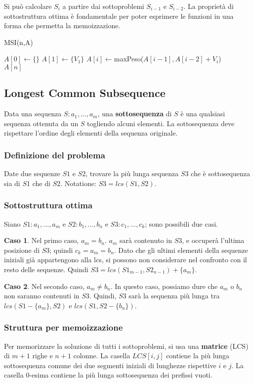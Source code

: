 \documentclass[11pt]{article}
\begin{document}
Si può calcolare $S_i$ a partire dai sottoproblemi $S_{i-1}$ e $S_{i-2}$.
La proprietà di sottostruttura ottima è fondamentale per poter esprimere le funzioni in una forma che permetta la memoizzazione.
\begin{algorithm}
    \caption{MSI(n,A)}
    \begin{algorithmic}
        \State $A[0]\gets \{\}$
        \State $A[1]\gets \{V_1\}$
            \State $A[i]\gets$maxPeso($A[i-1], A[i-2]+V_i$)
        \EndFor\\
        \Return $A[n]$
    \end{algorithmic}
\end{algorithm}
\subsection{Longest Common Subsequence}
Data una sequenza $S:a_1,\dots,a_m$, una \textbf{sottosequenza} di $S$ è una qualsiasi sequenza ottenuta da un $S$ togliendo 
alcuni elementi. La sottosequenza deve rispettare l'ordine degli elementi della sequenza originale.
\subsubsection{Definizione del problema}
Date due sequenze $S1$ e $S2$, trovare la più lunga sequenza $S3$ che è sottosequenza sia di $S1$ che di $S2$. Notatione:
$S3=lcs(S1,S2)$.
\subsubsection{Sottostruttura ottima}
Siano $S1:a_1,\dots,a_m$ e $S2:b_1,\dots,b_n$ e $S3:c_1,\dots,c_k$; sono possibili due casi.

\textbf{Caso 1}. Nel primo caso, $a_m=b_n$. $a_m$ sarà contenuto in $S3$, e occuperà l'ultima posizione di $S3$; quindi 
$c_k=a_m=b_n$. Dato che gli ultimi elementi della sequenze iniziali già appartengono alla lcs, si possono non considerare
nel confronto con il resto delle sequenze. Quindi $S3=lcs(S1_{m-1},S2_{n-1})+\{a_m\}$.

\textbf{Caso 2}. Nel secondo caso, $a_m\neq b_n$. In questo caso, possiamo dure che $a_m$ o $b_n$ non saranno contenuti 
in $S3$. Quindi, $S3$ sarà la sequenza più lunga tra $lcs(S1-\{a_m\},S2)$ e $lcs(S1,S2-\{b_n\})$.
\subsubsection{Struttura per memoizzazione}
Per memorizzare la soluzione di tutti i sottoproblemi, si usa una \textbf{matrice} (LCS) di $m+1$ righe e $n+1$ colonne. La 
casella $LCS[i,j]$ contiene la più lunga sottosequenza comune dei due segmenti iniziali di lunghezze rispettive $i$ e $j$.
La casella 0-esima contiene la più lunga sottosequenza dei prefissi vuoti.
\end{document}
